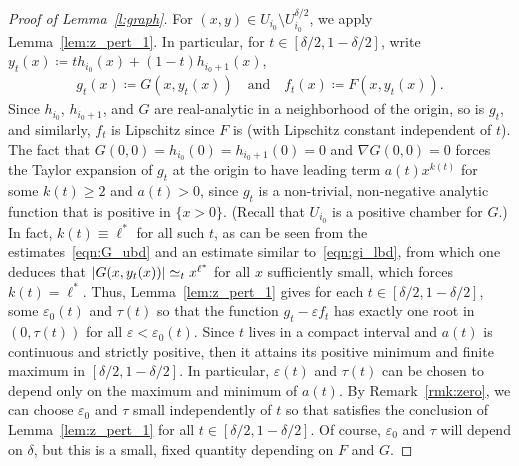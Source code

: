\documentclass[10pt]{amsart}
\theoremstyle{definition}\newtheorem{defi}[theo]{Definition}\newtheorem{rema}[theo]{Remark}\newtheorem{exam}[theo]{Example}\newtheorem{exem}[theo]{Example}\newtheorem{nota}[theo]{Notation}
\newcommand{\abs}[1]{\left \lvert #1 \right \rvert}
\renewcommand{\epsilon}{\varepsilon}
\let\originalleft\left
\let\originalright\right
\renewcommand{\left}{\mathopen{}\mathclose\bgroup\originalleft}
\renewcommand{\right}{\aftergroup\egroup\originalright}
\begin{document}
\begin{proof}[Proof of Lemma~\ref{l:graph}]
For $(x,y) \in U_{i_0} \setminus U_{i_0}^{\delta/2}$, we apply Lemma~\ref{lem:z_pert_1}. In particular, for $t \in [\delta/2, 1- \delta/2]$, write $y_t(x) \coloneqq t h_{i_0}(x) + (1-t) h_{i_0+1}(x)$,
\begin{align*}
g_t(x) \coloneqq G(x, y_t(x)) \quad\text{and}\quad f_t(x) \coloneqq F(x, y_t(x)).
\end{align*}
Since $h_{i_0}$, $h_{i_0+1}$, and $G$ are real-analytic in a neighborhood of the origin, so is $g_t$, and similarly, $f_t$ is Lipschitz since $F$ is (with Lipschitz constant independent of $t$). The fact that $G(0,0) = h_{i_0}(0) = h_{i_0+1}(0) = 0$ and $\nabla G(0,0) =0$ forces the Taylor expansion of $g_t$ at the origin to have leading term $a(t) x^{k(t)}$ for some $k(t) \ge 2$ and $a(t) >0$, since $g_t$ is a non-trivial, non-negative analytic function that is positive in $\{x >0\}$. (Recall that $U_{i_0}$ is a positive chamber for $G$.) In fact, $k(t) \equiv \ell^*$ for all such $t$, as can be seen from the estimates~\eqref{eqn:G_ubd} and an estimate similar to~\eqref{eqn:gi_lbd}, from which one deduces that $\abs{G(x, y_t(x))} \simeq_t x^{\ell^*}$ for all $x$ sufficiently small, which forces $k(t) = \ell^*$. Thus, Lemma~\ref{lem:z_pert_1} gives for each $t \in [\delta/2, 1 -\delta/2]$, some $\epsilon_0(t)$ and $\tau(t)$ so that the function $g_t - \epsilon f_t$ has exactly one root in $(0, \tau(t))$ for all $\epsilon < \epsilon_0(t)$. Since $t$ lives in a compact interval and $a(t)$ is continuous and strictly positive, then it attains its positive minimum and finite maximum in $[\delta/2, 1-\delta/2]$. In particular, $\epsilon(t)$ and $\tau(t)$ can be chosen to depend only on the maximum and minimum of $a(t)$. By Remark~\ref{rmk:zero}, we can choose $\epsilon_0$ and $\tau$ small independently of $t$ so that satisfies the conclusion of Lemma~\ref{lem:z_pert_1} for all $t \in [\delta/2, 1-\delta/2]$. Of course, $\epsilon_0$ and $\tau$ will depend on $\delta$, but this is a small, fixed quantity depending on $F$ and $G$.


\end{proof}
\end{document}
